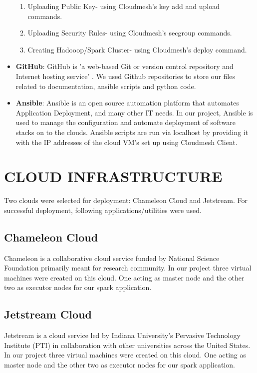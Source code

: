 \documentclass[9pt,twocolumn,twoside]{../../styles/osajnl}
\begin{document}
\begin{itemize}
	\begin{enumerate}
		\item {Uploading Public Key-} using Cloudmesh's key add and upload commands.
		\item {Uploading Security Rules-} using Cloudmesh's secgroup commands.  
		\item {Creating Hadooop/Spark Cluster-} using Cloudmesh's deploy command. 
	\end{enumerate}
	
	\item \textbf{GitHub}: GitHub is 'a web-based Git or version control repository and Internet hosting service' \cite{www-Github}. We used Github repositories to store our files related to documentation, ansible scripts and python code.
	
	\item \textbf{Ansible}: Ansible is an open source automation platform that automates Application Deployment, and many other IT needs. In our project, Ansible is used to manage the configuration and automate deployment of software stacks on to the clouds. Ansible scripts are run via localhost by providing it with the IP addresses of the cloud VM's set up using Cloudmesh Client.
	
\end{itemize}				


\section{CLOUD INFRASTRUCTURE}
	Two clouds were selected for deployment: Chameleon Cloud and Jetstream. For successful deployment, following applications/utilities were used.
	\subsection{Chameleon Cloud}
		Chameleon  is a collaborative cloud service funded by National Science Foundation primarily meant for research community. In our project three virtual machines were created on this cloud. One acting as master node and the other two as executor nodes for our spark application.
	
	\subsection{Jetstream Cloud}
		Jetstream is a cloud service led by Indiana University’s Pervasive Technology Institute (PTI) in collaboration with other universities \cite{www-jetstream} across the United States. In our project three virtual machines were created on this cloud. One acting as master node and the other two as executor nodes for our spark application.
		
\end{document}
